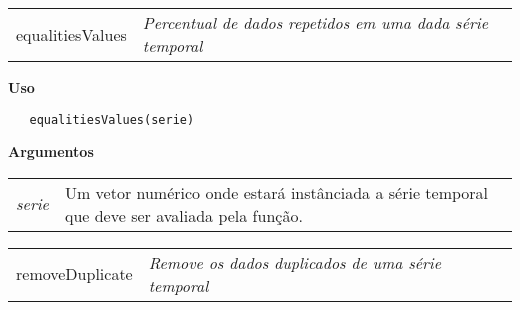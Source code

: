 
\hrulefill   

\begin{table}[!ht]
\begin{center}
\begin{tabularx}{\textwidth}{ X X}
\hspace{0.5cm} equalitiesValues & \textit{Percentual de dados repetidos em uma dada série temporal}\\
\end{tabularx}
\end{center}
\end{table} 

\vspace{-0.5cm}

\hrulefill  

\vspace{0.5cm}

\textbf{Uso}

\begin{lstlisting}
   equalitiesValues(serie)
\end{lstlisting}

\vspace{0.5cm}

\textbf{Argumentos}

\begin{table}[!ht]
\begin{center}
\begin{tabularx}{\textwidth}{X X}
\hspace{0.5cm} \textit{serie} & Um vetor numérico onde estará instânciada a série temporal que deve ser avaliada pela função.\\
\end{tabularx}
\end{center}
\end{table} 

\newpage


\hrulefill   

\begin{table}[!ht]
\begin{center}
\begin{tabularx}{\textwidth}{X X}
\hspace{0.5cm} removeDuplicate & \textit{Remove os dados duplicados de uma série temporal}\\
\end{tabularx}
\end{center}
\end{table} 

